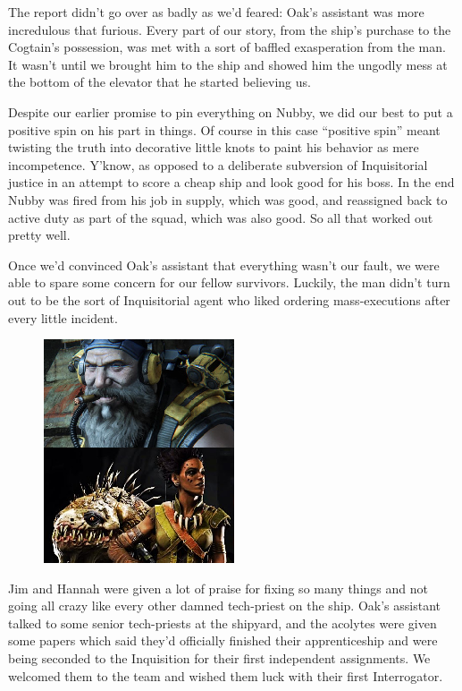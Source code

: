 The report didn’t go over as badly as we’d feared: 
Oak’s assistant was more incredulous that furious. 
Every part of our story, from the ship’s purchase to the Cogtain’s possession, was met with a sort of baffled exasperation from the man. 
It wasn’t until we brought him to the ship and showed him the ungodly mess at the bottom of the elevator that he started believing us.

Despite our earlier promise to pin everything on Nubby, we did our best to put a positive spin on his part in things. 
Of course in this case “positive spin” meant twisting the truth into decorative little knots to paint his behavior as mere incompetence. 
Y’know, as opposed to a deliberate subversion of Inquisitorial justice in an attempt to score a cheap ship and look good for his boss. 
In the end Nubby was fired from his job in supply, which was good, and reassigned back to active duty as part of the squad, which was also good. 
So all that worked out pretty well.

Once we’d convinced Oak’s assistant that everything wasn’t our fault, we were able to spare some concern for our fellow survivors. 
Luckily, the man didn’t turn out to be the sort of Inquisitorial agent who liked ordering mass-executions after every little incident.

\begin{figure}
	\begin{center}
		\includegraphics[width=\figwidth]{pics/7/53.png}
	\end{center}
\end{figure}
Jim and Hannah were given a lot of praise for fixing so many things and not going all crazy like every other damned tech-priest on the ship. 
Oak’s assistant talked to some senior tech-priests at the shipyard, and the acolytes were given some papers which said they’d officially finished their apprenticeship and were being seconded to the Inquisition for their first independent assignments. 
We welcomed them to the team and wished them luck with their first Interrogator.

